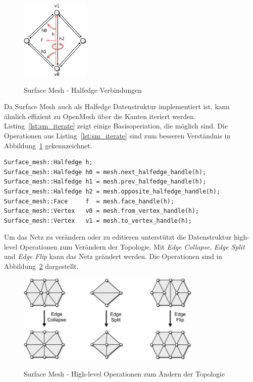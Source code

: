 \begin{figure}[h]
  \caption{Surface Mesh - Halfedge Verbindungen}
  \centering
  \includegraphics[width=0.3\textwidth]{content/media/sm_connectivity-queries}
  \label{fig:sm_halfedge}
\end{figure}

Da Surface Mesh auch als Halfedge Datenstruktur implementiert ist, kann ähnlich effizient zu OpenMesh über die Kanten iteriert werden.
Listing~\ref{lst:sm_iterate} zeigt einige Basisoperiation, die möglich sind.
Die Operationen aus Listing~\ref{lst:sm_iterate} sind zum besseren Verständnis in Abbildung~\ref{fig:sm_halfedge} gekennzeichnet. \cite{OpenGP.24.07.2015}

\begin{lstlisting}[style=myCppStyle, caption=Surface Mesh - Basisoperationen, label=lst:sm_iterate]
Surface_mesh::Halfedge h;
Surface_mesh::Halfedge h0 = mesh.next_halfedge_handle(h);
Surface_mesh::Halfedge h1 = mesh.prev_halfedge_handle(h);
Surface_mesh::Halfedge h2 = mesh.opposite_halfedge_handle(h);
Surface_mesh::Face     f  = mesh.face_handle(h);
Surface_mesh::Vertex   v0 = mesh.from_vertex_handle(h);
Surface_mesh::Vertex   v1 = mesh.to_vertex_handle(h);
\end{lstlisting}

Um das Netz zu verändern oder zu editieren unterstützt die Datenstruktur high-level Operationen zum Verändern der Topologie.
Mit \emph{Edge Collapse}, \emph{Edge Split} und \emph{Edge Flip} kann das Netz geändert werden.
Die Operationen sind in Abbildung~\ref{fig:sm_topology} dargestellt. \cite{OpenGP.24.07.2015}

\begin{figure}[h]
  \caption{Surface Mesh - High-level Operationen zum Ändern der Topologie}
  \centering
  \includegraphics[width=0.8\textwidth]{content/media/sm_topology-changes}
  \label{fig:sm_topology}
\end{figure}

